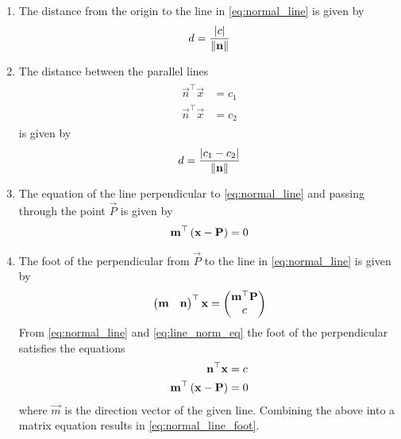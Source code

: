 \documentclass[journal,12pt,onecolumn]{IEEEtran}
\renewcommand\thesection{\arabic{section}}
\renewcommand\thesubsection{\thesection.\arabic{subsection}}
\begin{document}
\begin{enumerate}[label=\thesubsection.\arabic*.,ref=\thesubsection.\theenumi]
	\item The distance from the origin to the line  in 
	\eqref{eq:normal_line}
	is given by 
\begin{align}
	\label{eq:dist_line_2d_orig}
	d = \frac{\left\vert   c \right\vert}{\left\lVert\mathbf{n}\right\rVert}	
\end{align}
\item The distance between the parallel lines 
\begin{align}
	\label{eq:parallel_lines}
	\begin{split}
		\vec{n}^{\top}\vec{x} &= c_1
		\\
		\vec{n}^{\top}\vec{x} &= c_2
	\end{split}
\end{align}
is given by 
\begin{align}
	\label{eq:dist_lines_2d}
	d = \frac{\left\vert   c_1-c_2 \right\vert}{\left\lVert\mathbf{n}\right\rVert}	
\end{align}
\item The equation of the line perpendicular to 
	\eqref{eq:normal_line}
		and passing through the point $\vec{P}$ is given by 
\begin{align}
	\mathbf{m}^{\top}\left(\mathbf{x}-\mathbf{P}\right)  = 0
\end{align}
\item The foot of the perpendicular from $\vec{P}$ to the line in 
	\eqref{eq:normal_line}
	is given by 
\begin{align}
	\label{eq:normal_line_foot}
	\begin{pmatrix} \mathbf{m} & \mathbf{n}\end{pmatrix}^{\top}\mathbf{x}= \begin{pmatrix}\mathbf{m}^{\top}\mathbf{P}\\ c \end{pmatrix}  
\end{align}
% 
\solution From
	\eqref{eq:normal_line} and 
\eqref{eq:line_norm_eq}
the foot of the perpendicular satisfies the equations 
\begin{align}
	\mathbf{n}^{\top}\mathbf{x} &= c
	\\
	\mathbf{m}^{\top}\left(\mathbf{x}-\mathbf{P} \right)&=0 
\end{align}
where $\vec{m}$ is the direction vector of the given line.  Combining the above into a matrix equation results in 
	\eqref{eq:normal_line_foot}.


\end{enumerate}
\end{document}

